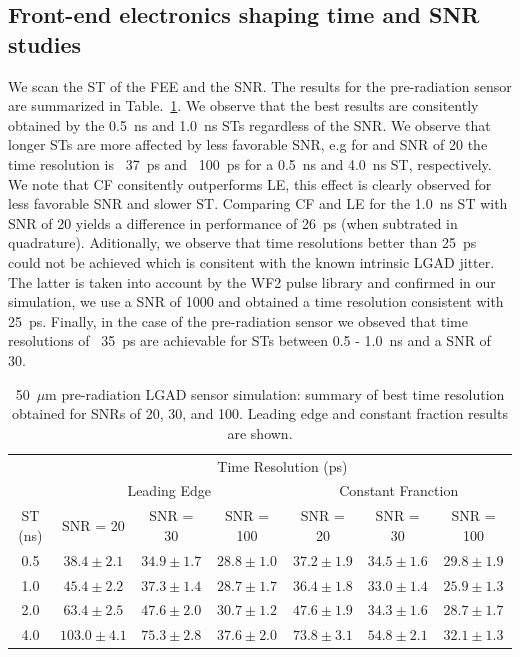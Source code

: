 \documentclass[preprint,1p]{elsarticle}
\begin{document}
\subsection{Front-end electronics shaping time and SNR studies}\label{sec:shaping_time}
We scan the ST of the FEE and the SNR. The results for the pre-radiation sensor are summarized in Table.~\ref{tab:shaping_time_prerad}.
 We observe that the best results are consitently obtained by the 0.5~\si{ns} and 1.0~\si{ns} STs regardless of the SNR. We observe that
 longer STs are more affected by less favorable SNR, e.g for and SNR of 20 the time resolution is ~37~\si{ps} and ~100~\si{ps} for a
 0.5~\si{ns} and 4.0~\si{ns} ST, respectively. We note that CF consitently outperforms LE, this effect is clearly observed
 for less favorable SNR and slower ST. Comparing CF and LE for the 1.0~\si{ns} ST with SNR of 20 yields a difference in performance of
 26~\si{ps} (when subtrated in quadrature). Aditionally, we observe that time resolutions better than 25~\si{ps} could not be achieved which
 is consitent with the known intrinsic LGAD jitter. The latter is taken into account by the WF2 pulse library and confirmed in our
 simulation, we use a SNR of 1000 and obtained a time resolution consistent with 25~\si{ps}. Finally, in the case of the pre-radiation sensor
 we obseved that time resolutions of ~35~\si{ps} are achievable for STs between 0.5 - 1.0~\si{ns} and a SNR of 30.


\begin{table}\label{tab:shaping_time_prerad}
    \begin{tabular}{c|ccc|ccc}
    \multicolumn{1}{c}{}& \multicolumn{6}{c}{Time Resolution (ps)} \\
    \multicolumn{1}{c}{}&\multicolumn{3}{c}{Leading Edge} & \multicolumn{3}{c}{Constant Franction}\\ \hline
    ST (ns) & SNR = 20   & SNR = 30      & SNR = 100     & SNR = 20      & SNR = 30      & SNR = 100 \\
    0.5 & $38.4 \pm 2.1$  & $34.9 \pm 1.7$  & $28.8 \pm 1.0$  & $37.2 \pm 1.9$  & $34.5 \pm 1.6$  & $29.8 \pm 1.9$ \\
    1.0 & $45.4 \pm 2.2$  & $37.3 \pm 1.4$  & $28.7 \pm 1.7$  & $36.4 \pm 1.8$  & $33.0 \pm 1.4$  & $25.9 \pm 1.3$ \\
    2.0 & $63.4 \pm 2.5$  & $47.6 \pm 2.0$  & $30.7 \pm 1.2$  & $47.6 \pm 1.9$  & $34.3 \pm 1.6$  & $28.7 \pm 1.7$ \\
    4.0 & $103.0 \pm 4.1$  & $75.3 \pm 2.8$  & $37.6 \pm 2.0$  & $73.8 \pm 3.1$  & $54.8 \pm 2.1$  & $32.1 \pm 1.3$ \\
    \end{tabular}
    \caption{50~$\mu$m pre-radiation LGAD sensor simulation: summary of best time resolution obtained for SNRs
    of 20, 30, and 100. Leading edge and constant fraction results are shown.}
 \end{table}
\end{document}
